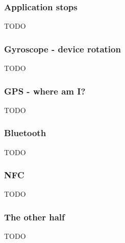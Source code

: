 \subsubsection{Application stops}
%
TODO
%
%
\subsubsection{Gyroscope - device rotation}
%
TODO
%
%
%
\subsubsection{GPS - where am I?}
%
TODO
%
%
%
\subsubsection{Bluetooth}
%
TODO
%
%
%
\subsubsection{NFC}
%
TODO
%
%
%
\subsubsection{The other half}
%
TODO
%